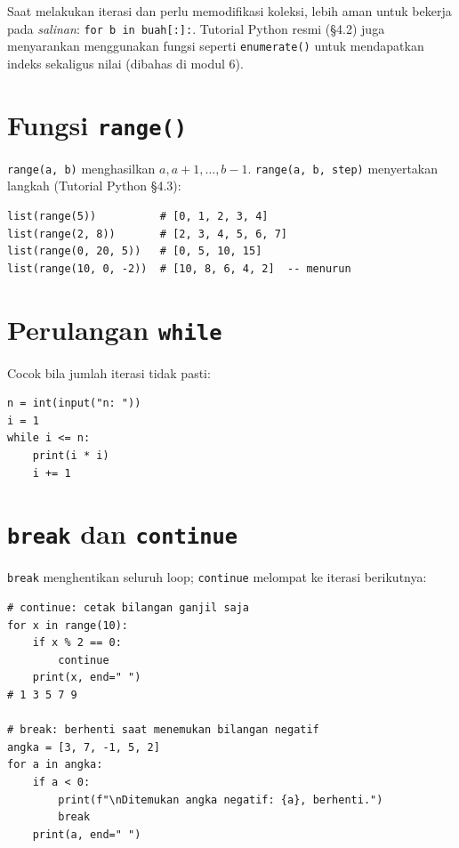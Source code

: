 ﻿\documentclass[../main.tex]{subfiles}
\begin{document}
\begin{konsep}
Saat melakukan iterasi dan perlu memodifikasi koleksi, lebih aman untuk bekerja pada \textit{salinan}: \texttt{for b in buah[:]:}. Tutorial Python resmi (§4.2) juga menyarankan menggunakan fungsi seperti \texttt{enumerate()} untuk mendapatkan indeks sekaligus nilai (dibahas di modul 6).
\end{konsep}

\section{Fungsi \texttt{range()}}

\texttt{range(a, b)} menghasilkan $a, a+1, \ldots, b-1$. \texttt{range(a, b, step)} menyertakan langkah (Tutorial Python §4.3):

\begin{lstlisting}[caption=Variasi range]
list(range(5))          # [0, 1, 2, 3, 4]
list(range(2, 8))       # [2, 3, 4, 5, 6, 7]
list(range(0, 20, 5))   # [0, 5, 10, 15]
list(range(10, 0, -2))  # [10, 8, 6, 4, 2]  -- menurun
\end{lstlisting}

\section{Perulangan \texttt{while}}

Cocok bila jumlah iterasi tidak pasti:

\begin{lstlisting}[caption=while]
n = int(input("n: "))
i = 1
while i <= n:
    print(i * i)
    i += 1
\end{lstlisting}

\section{\texttt{break} dan \texttt{continue}}

\texttt{break} menghentikan seluruh loop; \texttt{continue} melompat ke iterasi berikutnya:

\begin{lstlisting}[caption=break dan continue]
# continue: cetak bilangan ganjil saja
for x in range(10):
    if x % 2 == 0:
        continue
    print(x, end=" ")
# 1 3 5 7 9

# break: berhenti saat menemukan bilangan negatif
angka = [3, 7, -1, 5, 2]
for a in angka:
    if a < 0:
        print(f"\nDitemukan angka negatif: {a}, berhenti.")
        break
    print(a, end=" ")
\end{lstlisting}
\end{document}

